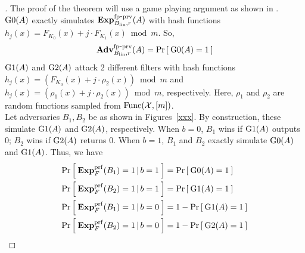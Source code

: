 \begin{proof}[]
The proof of the theorem will use a game playing argument as shown in . $\text{G0}(A)$ exactly simulates $\mathrm{\mathbf{Exp}}^{\mathrm{fp\mbox{-}prv}}_{B_\mathrm{lin},r}(A)$ with hash functions $h_j(x) =  F_{K_0}(x) + j\cdot F_{K_1}(x) \bmod m$. So,
\begin{equation}
\mathrm{\mathbf{Adv}}^{\mathrm{fp\mbox{-}prv}}_{B_{\mathrm{lin}},r}(A) = \Pr\left[\: \text{G0}(A)=1 \:\right]\label{eq:0}
\end{equation}
 $\text{G1}(A)$ and $\text{G2}(A)$ attack 2 different filters with hash functions 
$h_j(x) = ( F_{K_0}(x) + j\cdot \rho_2(x)) \bmod m$ and $h_j(x) = ( \rho_1(x) + j \cdot \rho_2(x)) \bmod m$, respectively.
Here, $\rho_1$ and $\rho_2$ are random functions sampled from $\mathrm{Func}({\cal X},[m])$. \\

Let adversaries $B_1, B_2$ be as shown in Figures~\ref{xxx}.  By
construction, these simulate $\text{G1}(A)$ and $\text{G2}(A)$,
respectively. When $b=0$, $B_1$ wins if $\text{G1}(A)$ outputs 0; $B_2$
wins if $\text{G2}(A)$ returns 0. When $b=1$, $B_1$ and $B_2$ exactly
simulate $\text{G0}(A)$ and $\text{G1}(A)$.   Thus, we have
\begin{align}
\Pr\left[\: \mathbf{Exp}^{\mathrm{prf}}_{F}(B_1) = 1\,|\,b=1 \:\right] &= \Pr\left[\: \text{G0}(A)=1 \:\right]\label{eq:m1}\\
\Pr\left[\: \mathbf{Exp}^{\mathrm{prf}}_{F}(B_2) = 1\,|\,b=1 \:\right] &= \Pr\left[\: \text{G1}(A)=1 \:\right]\label{eq:m2}\\
\Pr\left[\: \mathbf{Exp}^{\mathrm{prf}}_{F}(B_1) = 1\,|\,b=0 \:\right] &= 1-\Pr\left[\: \text{G1}(A)=1 \:\right]\label{eq:m3}\\
\Pr\left[\: \mathbf{Exp}^{\mathrm{prf}}_{F}(B_2) = 1\,|\,b=0 \:\right] &= 1-\Pr\left[\: \text{G2}(A)=1 \:\right]\label{eq:m4}
\end{align}


\end{proof}
